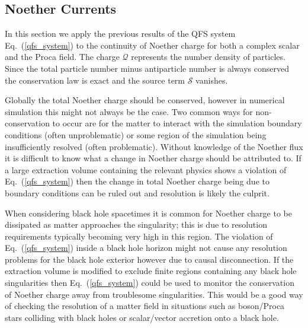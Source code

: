 \subsection{Noether Currents} \label{sect:noether}

In this section we apply the previous results of the QFS system Eq.~(\ref{qfs_system})
to the continuity of Noether charge for both a complex scalar and the Proca field. The charge $\mathcal{Q}$ represents the number density of particles. Since the total particle number minus antiparticle number is always conserved the conservation law is exact and the source term $\mathcal{S}$ vanishes. 

Globally the total Noether charge should be conserved, however in numerical simulation this might not always be the case. Two common ways for non-conservation to occur are for the matter to interact with the simulation boundary conditions (often unproblematic) or some region of the simulation being insufficiently resolved (often problematic). Without knowledge of the Noether flux it is difficult to know what a change in Noether charge should be attributed to. If a large extraction volume containing the relevant physics shows a violation of Eq.~(\ref{qfs_system}) then the change in total Noether charge being due to boundary conditions can be ruled out and resolution is likely the culprit. 

When considering black hole spacetimes it is common for Noether charge to be dissipated as matter approaches the singularity; this is due to resolution requirements typically becoming very high in this region. The violation of Eq.~(\ref{qfs_system}) inside a black hole horizon might not cause any resolution problems for the black hole exterior however due to causal disconnection. If the extraction volume is modified to exclude finite regions containing any black hole singularities then Eq.~(\ref{qfs_system}) could be used to monitor the conservation of Noether charge away from troublesome singularities. This would be a good way of checking the resolution of a matter field in situations such as boson/Proca stars colliding with black holes or scalar/vector accretion onto a black hole.




